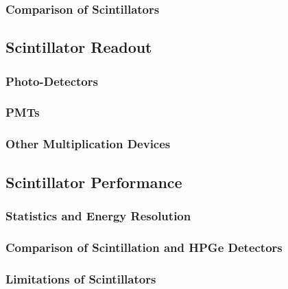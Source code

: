 \subsubsection{Comparison of Scintillators}


\subsection{Scintillator Readout}
\subsubsection{Photo-Detectors}
\subsubsection{PMTs}
\subsubsection{Other Multiplication Devices}
\subsection{Scintillator Performance}
\subsubsection{Statistics and Energy Resolution}
\subsubsection{Comparison of Scintillation and HPGe Detectors}
\subsubsection{Limitations of Scintillators}
